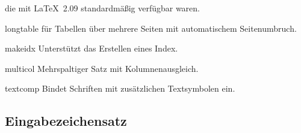 \begin{table}[htbp]
\begin{lminipage}{11cm}
\begin{ttdescription}
  die mit \LaTeX~2.09 standardmäßig verfügbar waren.
\item[longtable]
  für Tabellen über mehrere Seiten mit automatischem Seitenumbruch.
\item[makeidx] Unterstützt das Erstellen eines Index.
\item[multicol] Mehrspaltiger Satz mit Kolumnenausgleich.
\item[textcomp] Bindet Schriften mit zusätzlichen Textsymbolen ein.
\end{ttdescription}
\end{lminipage}
\end{table}


\subsection{Eingabezeichensatz}\label{inputenc}

